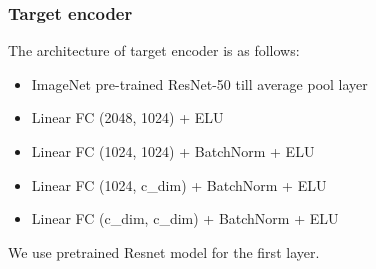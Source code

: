 \documentclass[11pt]{article}
\providecommand{\tightlist}{%
      \setlength{\itemsep}{0pt}\setlength{\parskip}{0pt}}
\begin{document}
    \hypertarget{target-encoder}{%
\subsubsection{Target encoder}\label{target-encoder}}

The architecture of target encoder is as follows:

\begin{itemize}
\tightlist
\item
  ImageNet pre-trained ResNet-50 till average pool layer
\item
  Linear FC (2048, 1024) + ELU
\item
  Linear FC (1024, 1024) + BatchNorm + ELU
\item
  Linear FC (1024, c\_dim) + BatchNorm + ELU
\item
  Linear FC (c\_dim, c\_dim) + BatchNorm + ELU
\end{itemize}

We use pretrained Resnet model for the first layer.
\end{document}
